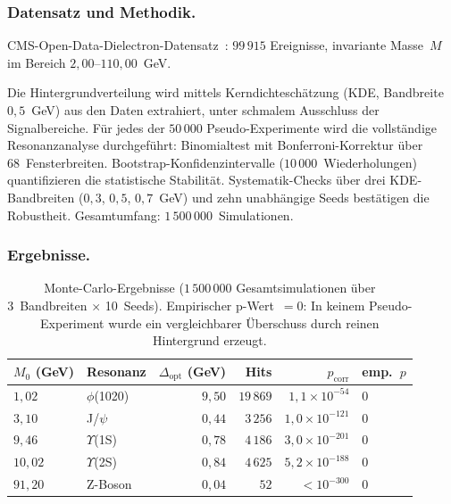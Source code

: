 \documentclass[12pt]{iopart}
\begin{document}
	\subsubsection{Datensatz und Methodik.}
	CMS-Open-Data-Dielectron-Datensatz~\cite{cms_opendata}:
	$99\,915$ Ereignisse, invariante Masse~$M$ im Bereich
	$2{,}00$--$110{,}00$~GeV.
	
	Die Hintergrundverteilung wird mittels Kerndichtesch\"atzung
	(KDE, Bandbreite $0{,}5$~GeV) aus den Daten extrahiert,
	unter schmalem Ausschluss der Signalbereiche.
	F\"ur jedes der $50\,000$ Pseudo-Experimente wird die
	vollst\"andige Resonanzanalyse durchgef\"uhrt: Binomialtest
	mit Bonferroni-Korrektur \"uber 68~Fensterbreiten.
	Bootstrap-Konfidenzintervalle ($10\,000$~Wiederholungen)
	quantifizieren die statistische Stabilit\"at.
	Systematik-Checks \"uber drei KDE-Bandbreiten
	($0{,}3$, $0{,}5$, $0{,}7$~GeV) und zehn unabh\"angige
	Seeds best\"atigen die Robustheit.
	Gesamtumfang: $1\,500\,000$~Simulationen.
	
	\subsubsection{Ergebnisse.}
	
	\begin{table}[ht]
		\centering
		\caption{Monte-Carlo-Ergebnisse
			($1\,500\,000$ Gesamtsimulationen \"uber
			3~Bandbreiten $\times$ 10~Seeds).
			Empirischer p-Wert~$= 0$: In keinem
			Pseudo-Experiment wurde ein vergleichbarer
			\"Uberschuss durch reinen Hintergrund erzeugt.}
		\label{tab:mc_results}
		\begin{tabular}{llrrrl}
			\hline
			$M_0$ (GeV) & Resonanz
			& $\Delta_{\mathrm{opt}}$ (GeV)
			& Hits & $p_{\mathrm{corr}}$
			& emp.\ $p$ \\
			\hline
			$1{,}02$ & $\phi$(1020) & $9{,}50$
			& $19\,869$ & $1{,}1 \times 10^{-54}$
			& $0$ \\
			$3{,}10$ & J/$\psi$ & $0{,}44$
			& $3\,256$ & $1{,}0 \times 10^{-121}$
			& $0$ \\
			$9{,}46$ & $\Upsilon$(1S) & $0{,}78$
			& $4\,186$ & $3{,}0 \times 10^{-201}$
			& $0$ \\
			$10{,}02$ & $\Upsilon$(2S) & $0{,}84$
			& $4\,625$ & $5{,}2 \times 10^{-188}$
			& $0$ \\
			$91{,}20$ & Z-Boson & $0{,}04$
			& $52$ & $< 10^{-300}$
			& $0$ \\
			\hline
		\end{tabular}
	\end{table}
	
\end{document}
